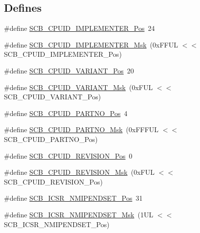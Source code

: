 \subsection*{\-Defines}
\begin{DoxyCompactItemize}
\item 
\#define \hyperlink{group___c_m_s_i_s___s_c_b_ga58686b88f94f789d4e6f429fe1ff58cf}{\-S\-C\-B\-\_\-\-C\-P\-U\-I\-D\-\_\-\-I\-M\-P\-L\-E\-M\-E\-N\-T\-E\-R\-\_\-\-Pos}~24
\item 
\#define \hyperlink{group___c_m_s_i_s___s_c_b_ga0932b31faafd47656a03ced75a31d99b}{\-S\-C\-B\-\_\-\-C\-P\-U\-I\-D\-\_\-\-I\-M\-P\-L\-E\-M\-E\-N\-T\-E\-R\-\_\-\-Msk}~(0x\-F\-F\-U\-L $<$$<$ S\-C\-B\-\_\-\-C\-P\-U\-I\-D\-\_\-\-I\-M\-P\-L\-E\-M\-E\-N\-T\-E\-R\-\_\-\-Pos)
\item 
\#define \hyperlink{group___c_m_s_i_s___s_c_b_ga104462bd0815391b4044a70bd15d3a71}{\-S\-C\-B\-\_\-\-C\-P\-U\-I\-D\-\_\-\-V\-A\-R\-I\-A\-N\-T\-\_\-\-Pos}~20
\item 
\#define \hyperlink{group___c_m_s_i_s___s_c_b_gad358dfbd04300afc1824329d128b99e8}{\-S\-C\-B\-\_\-\-C\-P\-U\-I\-D\-\_\-\-V\-A\-R\-I\-A\-N\-T\-\_\-\-Msk}~(0x\-F\-U\-L $<$$<$ S\-C\-B\-\_\-\-C\-P\-U\-I\-D\-\_\-\-V\-A\-R\-I\-A\-N\-T\-\_\-\-Pos)
\item 
\#define \hyperlink{group___c_m_s_i_s___s_c_b_ga705f68eaa9afb042ca2407dc4e4629ac}{\-S\-C\-B\-\_\-\-C\-P\-U\-I\-D\-\_\-\-P\-A\-R\-T\-N\-O\-\_\-\-Pos}~4
\item 
\#define \hyperlink{group___c_m_s_i_s___s_c_b_ga98e581423ca016680c238c469aba546d}{\-S\-C\-B\-\_\-\-C\-P\-U\-I\-D\-\_\-\-P\-A\-R\-T\-N\-O\-\_\-\-Msk}~(0x\-F\-F\-F\-U\-L $<$$<$ S\-C\-B\-\_\-\-C\-P\-U\-I\-D\-\_\-\-P\-A\-R\-T\-N\-O\-\_\-\-Pos)
\item 
\#define \hyperlink{group___c_m_s_i_s___s_c_b_ga3c3d9071e574de11fb27ba57034838b1}{\-S\-C\-B\-\_\-\-C\-P\-U\-I\-D\-\_\-\-R\-E\-V\-I\-S\-I\-O\-N\-\_\-\-Pos}~0
\item 
\#define \hyperlink{group___c_m_s_i_s___s_c_b_ga2ec0448b6483f77e7f5d08b4b81d85df}{\-S\-C\-B\-\_\-\-C\-P\-U\-I\-D\-\_\-\-R\-E\-V\-I\-S\-I\-O\-N\-\_\-\-Msk}~(0x\-F\-U\-L $<$$<$ S\-C\-B\-\_\-\-C\-P\-U\-I\-D\-\_\-\-R\-E\-V\-I\-S\-I\-O\-N\-\_\-\-Pos)
\item 
\#define \hyperlink{group___c_m_s_i_s___s_c_b_ga750d4b52624a46d71356db4ea769573b}{\-S\-C\-B\-\_\-\-I\-C\-S\-R\-\_\-\-N\-M\-I\-P\-E\-N\-D\-S\-E\-T\-\_\-\-Pos}~31
\item 
\#define \hyperlink{group___c_m_s_i_s___s_c_b_ga340e3f79e9c3607dee9f2c048b6b22e8}{\-S\-C\-B\-\_\-\-I\-C\-S\-R\-\_\-\-N\-M\-I\-P\-E\-N\-D\-S\-E\-T\-\_\-\-Msk}~(1\-U\-L $<$$<$ S\-C\-B\-\_\-\-I\-C\-S\-R\-\_\-\-N\-M\-I\-P\-E\-N\-D\-S\-E\-T\-\_\-\-Pos)
$$
\end{DoxyCompactItemize}
